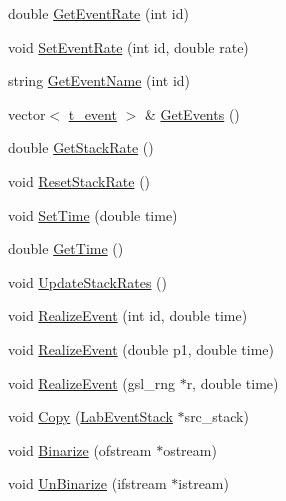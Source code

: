 \begin{DoxyCompactItemize}
\item 
double \hyperlink{classelps_1_1_lab_event_stack_a5738c80975f7d26a6349d9fc98d13175}{Get\+Event\+Rate} (int id)
\item 
void \hyperlink{classelps_1_1_lab_event_stack_a4a619922dfce62966b6b5c5c5cdca866}{Set\+Event\+Rate} (int id, double rate)
\item 
string \hyperlink{classelps_1_1_lab_event_stack_a6e8e674cb0a80a798d1a1ea33412f7cd}{Get\+Event\+Name} (int id)
\item 
vector$<$ \hyperlink{structelps_1_1_lab_event_stack_1_1t__event}{t\+\_\+event} $>$ \& \hyperlink{classelps_1_1_lab_event_stack_a773198530398aa727c8f34ac71c5ba07}{Get\+Events} ()
\item 
double \hyperlink{classelps_1_1_lab_event_stack_afcdede25277a57c56d3664d4484866b6}{Get\+Stack\+Rate} ()
\item 
void \hyperlink{classelps_1_1_lab_event_stack_a466e090d7d9159983033cf732e13d461}{Reset\+Stack\+Rate} ()
\item 
void \hyperlink{classelps_1_1_lab_event_stack_ab3b53f258a8150181f8bd0d14d4d561b}{Set\+Time} (double time)
\item 
double \hyperlink{classelps_1_1_lab_event_stack_aa7fa9442c7444b4027642ad287a78218}{Get\+Time} ()
\item 
void \hyperlink{classelps_1_1_lab_event_stack_a2c69343fc9e0218238c51004d854f900}{Update\+Stack\+Rates} ()
\item 
void \hyperlink{classelps_1_1_lab_event_stack_a8335ecf33bf6210d5cb9c8d30a125f6e}{Realize\+Event} (int id, double time)
\item 
void \hyperlink{classelps_1_1_lab_event_stack_a1c05c3df5a26836ad67fffce8d867774}{Realize\+Event} (double p1, double time)
\item 
void \hyperlink{classelps_1_1_lab_event_stack_a20fb911dc03289f6ef3b5222073c4b61}{Realize\+Event} (gsl\+\_\+rng $\ast$r, double time)
\item 
void \hyperlink{classelps_1_1_lab_event_stack_a50e06d24fbd5a91054b5024ef13ca6f0}{Copy} (\hyperlink{classelps_1_1_lab_event_stack}{Lab\+Event\+Stack} $\ast$src\+\_\+stack)
\item 
void \hyperlink{classelps_1_1_lab_event_stack_a85bb93839b48b856a2b4d9d99804c5e0}{Binarize} (ofstream $\ast$ostream)
\item 
void \hyperlink{classelps_1_1_lab_event_stack_a2d3587e25801f8e1f1950bc933846ab0}{Un\+Binarize} (ifstream $\ast$istream)
\end{DoxyCompactItemize}


